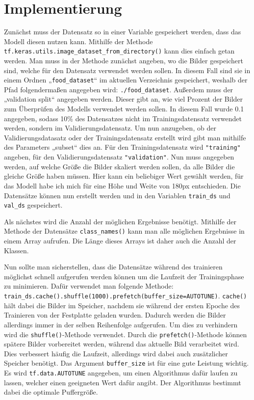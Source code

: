 \documentclass[11pt,oneside]{report}
\begin{document}
\section{Implementierung}
Zunächst muss der Datensatz so in einer Variable gespeichert werden, dass das Modell diesen nutzen kann. Mithilfe der Methode \verb+tf.keras.utils.image_dataset_from_directory()+ kann dies einfach getan werden. Man muss in der Methode zunächst angeben, wo die Bilder gespeichert sind, welche für den Datensatz verwendet werden sollen. In diesem Fall sind sie in einem Ordnen „\verb+food_dataset+“ im aktuellen Verzeichnis gespeichert, weshalb der Pfad folgendermaßen angegeben wird: \verb+./food_dataset+. Außerdem muss der „validation split“ angegeben werden. Dieser gibt an, wie viel Prozent der Bilder zum Überprüfen des Modells verwendet werden sollen. In diesem Fall wurde 0.1 angegeben, sodass 10\% des Datensatzes nicht im Trainingsdatensatz verwendet werden, sondern im Validierungsdatensatz. Um nun anzugeben, ob der Validierungsdatasatz oder der Trainingsdatensatz erstellt wird gibt man mithilfe des Parameters „subset“ dies an. Für den Trainingsdatensatz wird \verb+"training"+ angeben, für den Validierungsdatensatz \verb+"validation"+. Nun muss angegeben werden, auf welche Größe die Bilder skaliert werden sollen, da alle Bilder die gleiche Größe haben müssen. Hier kann ein beliebiger Wert gewählt werden, für das Modell habe ich mich für eine Höhe und Weite von 180px entschieden. Die Datensätze können nun erstellt werden und in den Variablen \verb+train_ds+ und \verb+val_ds+ gespeichert.

Als nächstes wird die Anzahl der möglichen Ergebnisse benötigt. Mithilfe der Methode der Datensätze \verb+class_names()+ kann man alle möglichen Ergebnisse in einem Array aufrufen. Die Länge dieses Arrays ist daher auch die Anzahl der Klassen.

Nun sollte man sicherstellen, dass die Datensätze während des trainieren möglichst schnell aufgerufen werden können um die Laufzeit der Trainingsphase zu minimieren. Dafür verwendet man folgende Methode: \verb+train_ds.cache().shuffle(1000).prefetch(buffer_size=AUTOTUNE)+. \verb+cache()+ hält dabei die Bilder im Speicher, nachdem sie während der ersten Epoche des Trainieren von der Festplatte geladen wurden. Dadurch werden die Bilder allerdings immer in der selben Reihenfolge aufgerufen. Um dies zu verhindern wird die \verb+shuffle()+-Methode verwendet. Durch die \verb+prefetch()+-Methode können spätere Bilder vorbereitet werden, während das aktuelle Bild verarbeitet wird. Dies verbessert häufig die Laufzeit, allerdings wird dabei auch zusätzlicher Speicher benötigt. Das Argument \verb+buffer_size+ ist für eine gute Leistung wichtig. Es wird \verb+tf.data.AUTOTUNE+ angegeben, um einen Algorithmus dafür laufen zu lassen, welcher einen geeigneten Wert dafür angibt. Der Algorithmus bestimmt dabei die optimale Puffergröße.
\end{document}
